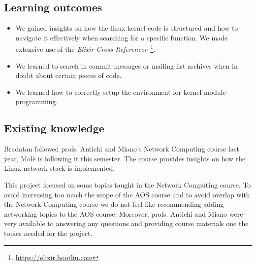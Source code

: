 \documentclass[10pt,a4]{article}
\begin{document}
\subsection{Learning outcomes}
\begin{itemize}

\item We gained insights on how the linux kernel code is structured and how to navigate it
effectively when searching for a specific function. We made extensive use of the \textit{Elixir Cross Referencer}~\footnote{\url{https://elixir.bootlin.com}}.

\item We learned to search in commit messages or mailing list archives when in doubt about certain pieces of code.
\item We learned how to correctly setup the environment for kernel module programming.

\end{itemize}




\subsection{Existing knowledge}

Bradatan followed profs. Antichi and Miano's Network Computing course last year,
Molè is following it this semester. The course provides insights on how the Linux
network stack is implemented.

This project focused on some topics taught in the Network Computing course. To
avoid increasing too much the scope of the AOS course and to avoid overlap with
the Network Computing course we do not feel like recommending adding networking
topics to the AOS course. Moreover, profs. Antichi and Miano were very available
to answering any questions and providing course materials one the topics needed
for the project.
\end{document}
